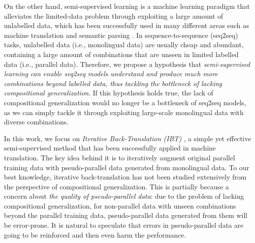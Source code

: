\documentclass[letterpaper]{article} %
\begin{document}

On the other hand, semi-supervised learning \cite{chapelle2009semi} is a machine learning paradigm that alleviates the limited-data problem through exploiting a large amount of unlabelled data, which has been successfully used in many different areas such as machine translation \cite{sennrich2016improving,he2016dual,skorokhodov2018semi} and semantic parsing \cite{yin2018structvae,cao2019semantic}.
In sequence-to-sequence (seq2seq) tasks, unlabelled data (i.e., monolingual data) are usually cheap and abundant, containing a large amount of combinations that are unseen in limited labelled data (i.e., parallel data).
Therefore, we propose a hypothesis that \emph{semi-supervised learning can enable seq2seq models understand and produce much more combinations beyond labelled data, thus tackling the bottleneck of lacking compositional generalization}.
If this hypothesis holds true, the lack of compositional generalization would no longer be a bottleneck of seq2seq models, as we can simply tackle it through exploiting large-scale monolingual data with diverse combinations.

In this work, we focus on \emph{Iterative Back-Translation (IBT)} \cite{hoang2018iterative}, a simple yet effective semi-supervised method that has been successfully applied in machine translation.
The key idea behind it is to iteratively augment original parallel training data with pseudo-parallel data generated from monolingual data.
To our best knowledge, iterative back-translation has not been studied extensively from the perspective of compositional generalization.
This is partially because a concern about \emph{the quality of pseudo-parallel data}:
due to the problem of lacking compositional generalization, for non-parallel data with unseen combinations beyond the parallel training data, pseudo-parallel data generated from them will be error-prone.
It is natural to speculate that errors in pseudo-parallel data are going to be reinforced and then even harm the performance.
\end{document}
